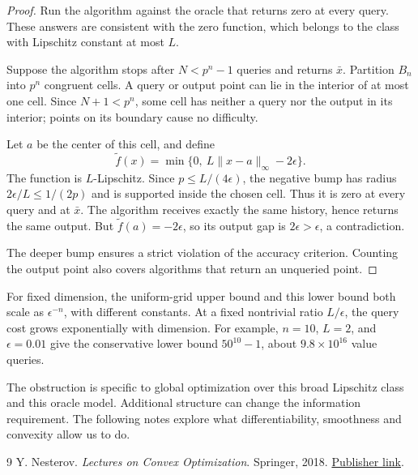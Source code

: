 \documentclass[11pt]{article}
\begin{document}
\begin{proof}
Run the algorithm against the oracle that returns zero at every query. These answers are consistent with the zero function, which belongs to the class with Lipschitz constant at most $L$.

Suppose the algorithm stops after $N<p^n-1$ queries and returns $\bar x$. Partition $B_n$ into $p^n$ congruent cells. A query or output point can lie in the interior of at most one cell. Since $N+1<p^n$, some cell has neither a query nor the output in its interior; points on its boundary cause no difficulty.

Let $a$ be the center of this cell, and define
\[
\widetilde f(x)=\min\{0,\ L\|x-a\|_\infty-2\epsilon\}.
\]
The function is $L$-Lipschitz. Since $p\le L/(4\epsilon)$, the negative bump has radius $2\epsilon/L\le1/(2p)$ and is supported inside the chosen cell. Thus it is zero at every query and at $\bar x$. The algorithm receives exactly the same history, hence returns the same output. But $\widetilde f(a)=-2\epsilon$, so its output gap is $2\epsilon>\epsilon$, a contradiction.

The deeper bump ensures a strict violation of the accuracy criterion. Counting the output point also covers algorithms that return an unqueried point.
\end{proof}

\begin{interpretation}
For fixed dimension, the uniform-grid upper bound and this lower bound both scale as $\epsilon^{-n}$, with different constants. At a fixed nontrivial ratio $L/\epsilon$, the query cost grows exponentially with dimension. For example, $n=10$, $L=2$, and $\epsilon=0.01$ give the conservative lower bound $50^{10}-1$, about $9.8\times10^{16}$ value queries.

The obstruction is specific to global optimization over this broad Lipschitz class and this oracle model. Additional structure can change the information requirement. The following notes explore what differentiability, smoothness and convexity allow us to do.
\end{interpretation}

\begin{thebibliography}{9}
 Y. Nesterov. \textit{Lectures on Convex Optimization}. Springer, 2018. \href{https://doi.org/10.1007/978-3-319-91578-4}{Publisher link}.
\end{thebibliography}
\end{document}
